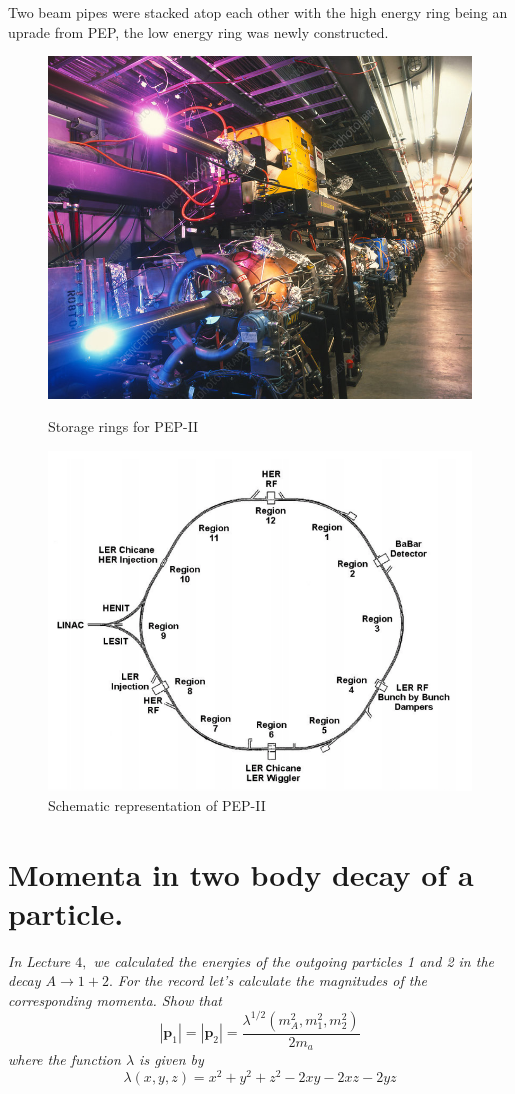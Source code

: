 \documentclass{article}
\begin{document}
Two beam pipes were stacked atop each other with the high energy ring being an uprade from PEP, the low energy ring was newly constructed.
\begin{figure}[h!]
\centering
    \begin{minipage}{.5\textwidth}
        \centering
        \includegraphics[width=0.5\linewidth]{figures/storage_rings.jpg}
        \caption{Storage rings for PEP-II}
        \label{fig:my_label}
    \end{minipage}
    \begin{minipage}{.5\textwidth}
        \centering
        \includegraphics[width=0.5\linewidth]{figures/pepII rings.png}
        \caption{Schematic representation of PEP-II}
        \label{fig:my_label}
    \end{minipage}
\end{figure}

\newpage


\section{Momenta in two body decay of a particle. }
\textit{In Lecture $4,$ we calculated the energies of the outgoing particles 1 and 2 in the decay $A \rightarrow 1+2 .$ For the record let's calculate the magnitudes of the corresponding momenta. Show that
$$
\left|\mathbf{p}_{1}\right|=\left|\mathbf{p}_{2}\right|=\frac{\lambda^{1 / 2}\left(m_{A}^{2}, m_{1}^{2}, m_{2}^{2}\right)}{2 m_{a}}
$$
where the function $\lambda$ is given by
$$
\lambda(x, y, z)=x^{2}+y^{2}+z^{2}-2 x y-2 x z-2 y z
$$}
\end{document}
